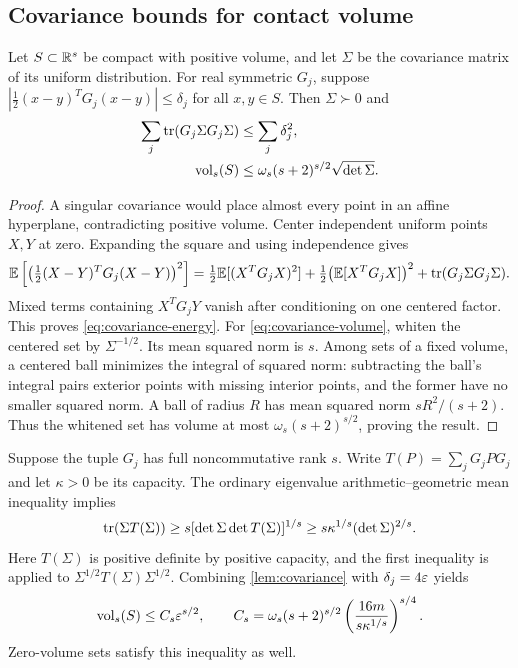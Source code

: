 \subsection{Covariance bounds for contact volume}

\begin{lemma}\label{lem:covariance}
Let $S\subset\mathbb R^s$ be compact with positive volume, and let $\Sigma$
be the covariance matrix of its uniform distribution. For real symmetric
$G_j$, suppose
$|\tfrac12(x-y)^TG_j(x-y)|\le\delta_j$ for all $x,y\in S$.
Then $\Sigma\succ0$ and
\begin{align}
 \sum_j\operatorname{tr}(G_j\Sigma G_j\Sigma)&\le\sum_j\delta_j^2,
 \label{eq:covariance-energy}\\
 \operatorname{vol}_s(S)&\le\omega_s(s+2)^{s/2}\sqrt{\det\Sigma}.
 \label{eq:covariance-volume}
\end{align}
\end{lemma}
\begin{proof}
A singular covariance would place almost every point in an affine
hyperplane, contradicting positive volume. Center independent uniform
points $X,Y$ at zero. Expanding the square and using independence gives
\[
 \mathbb E\left[\left(\tfrac12(X-Y)^TG_j(X-Y)\right)^2\right]
 =\tfrac12\mathbb E[(X^TG_jX)^2]
  +\tfrac12\bigl(\mathbb E[X^TG_jX]\bigr)^2
  +\operatorname{tr}(G_j\Sigma G_j\Sigma).
\]
Mixed terms containing $X^TG_jY$ vanish after conditioning on one
centered factor. This proves \eqref{eq:covariance-energy}.
For \eqref{eq:covariance-volume}, whiten the centered set by
$\Sigma^{-1/2}$. Its mean squared norm is $s$. Among sets of a fixed
volume, a centered ball minimizes the integral of squared norm:
subtracting the ball's integral pairs exterior points with missing
interior points, and the former have no smaller squared norm. A ball
of radius $R$ has mean squared norm $sR^2/(s+2)$. Thus the whitened
set has volume at most $\omega_s(s+2)^{s/2}$, proving the result.
\end{proof}

Suppose the tuple $G_j$ has full noncommutative rank $s$. Write
$T(P)=\sum_jG_jPG_j$ and let $\kappa>0$ be its capacity. The ordinary
eigenvalue arithmetic--geometric mean inequality implies
\begin{equation}\label{eq:energy-det}
 \operatorname{tr}(\Sigma T(\Sigma))
 \ge s[\det\Sigma\det T(\Sigma)]^{1/s}
 \ge s\kappa^{1/s}(\det\Sigma)^{2/s}.
\end{equation}
Here $T(\Sigma)$ is positive definite by positive capacity, and the
first inequality is applied to $\Sigma^{1/2}T(\Sigma)\Sigma^{1/2}$.
Combining \cref{lem:covariance} with $\delta_j=4\varepsilon$ yields
\begin{equation}\label{eq:ncrank-volume}
 \operatorname{vol}_s(S)\le C_s\varepsilon^{s/2},\qquad
 C_s=\omega_s(s+2)^{s/2}
       \left(\frac{16m}{s\kappa^{1/s}}\right)^{s/4}.
\end{equation}
Zero-volume sets satisfy this inequality as well.


